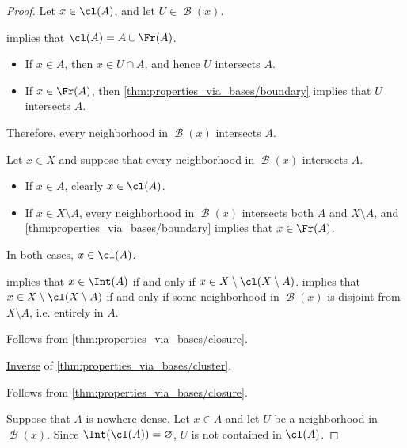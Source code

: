 \begin{proof}
  \SufficiencySubProof* Let \( x \in \cl(A) \), and let \( U \in \mscrB(x) \).

   implies that \( \cl(A) = A \cup \Fr(A) \).
  \begin{itemize}
    \item If \( x \in A \), then \( x \in U \cap A \), and hence \( U \) intersects \( A \).
    \item If \( x \in \Fr(A) \), then \cref{thm:properties_via_bases/boundary} implies that \( U \) intersects \( A \).
  \end{itemize}

  Therefore, every neighborhood in \( \mscrB(x) \) intersects \( A \).

  \NecessitySubProof* Let \( x \in X \) and suppose that every neighborhood in \( \mscrB(x) \) intersects \( A \).

  \begin{itemize}
    \item If \( x \in A \), clearly \( x \in \cl(A) \).
    \item If \( x \in X \setminus A \), every neighborhood in \( \mscrB(x) \) intersects both \( A \) and \( X \setminus A \), and \cref{thm:properties_via_bases/boundary} implies that \( x \in \Fr(A) \).
  \end{itemize}

  In both cases, \( x \in \cl(A) \).

    implies that \( x \in \Int(A) \) if and only if \( x \in X \setminus \cl(X \setminus A) \).  implies that \( x \in X \setminus \cl(X \setminus A) \) if and only if some neighborhood in \( \mscrB(x) \) is disjoint from \( X \setminus A \), i.e. entirely in \( A \).

   Follows from \cref{thm:properties_via_bases/closure}.

   \hyperref[def:conditional_formula/inverse]{Inverse} of \cref{thm:properties_via_bases/cluster}.

   Follows from \cref{thm:properties_via_bases/closure}.


  \SufficiencySubProof* Suppose that \( A \) is nowhere dense. Let \( x \in A \) and let \( U \) be a neighborhood in \( \mscrB(x) \). Since \( \Int(\cl(A)) = \varnothing \), \( U \) is not contained in \( \cl(A) \).


\end{proof}

